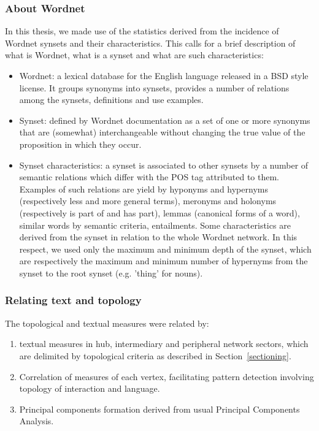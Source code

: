 \subsubsection{About Wordnet}
In this thesis, we made use of the statistics derived from the incidence of Wordnet synsets and their characteristics.
This calls for a brief description of what is Wordnet, what is a synset and what are such characteristics:
\begin{itemize}
	\item Wordnet: a lexical database for the English language released in a BSD style license. It groups synonyms into synsets, provides a number of relations among the synsets, definitions and use examples.
	\item Synset: defined by Wordnet documentation as a set of one or more synonyms that are (somewhat) interchangeable without changing the true value of the proposition in which they occur.
	\item Synset characteristics: a synset is associated to other synsets by a number of semantic relations which differ with the POS tag attributed to them.
		Examples of such relations are yield by hyponyms and hypernyms (respectively less and more general terms), meronyms and holonyms (respectively is part of and has part), lemmas (canonical forms of a word), similar words by semantic criteria, entailments.
		Some characteristics are derived from the synset in relation to the whole Wordnet network.
		In this respect, we used only the maximum and minimum depth of the synset, which are respectively the maximum and minimum number of hypernyms from the synset to the root synset (e.g. 'thing' for nouns).
\end{itemize}

\subsubsection{Relating text and topology}\label{sec:ks}
The topological and textual measures were related by:
\begin{enumerate}
	\item textual measures in hub, intermediary and peripheral network sectors, which are delimited by topological criteria as described in Section~\ref{sectioning}.
    \item Correlation of measures of each vertex, facilitating pattern detection involving topology of interaction and language.
    \item Principal components formation derived from usual Principal Components Analysis.
\end{enumerate}

